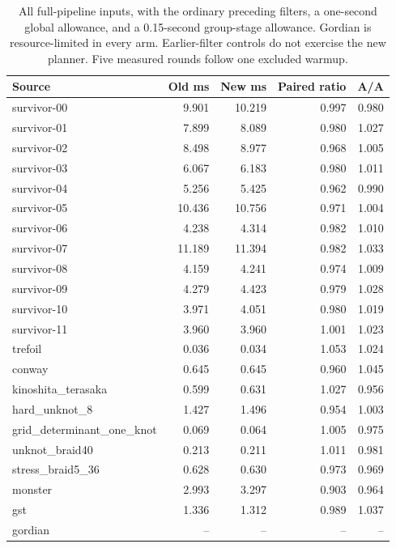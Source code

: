 \begin{table}[htbp]
\centering\small
\begin{tabular}{lrrrr}
\toprule
Source & Old ms & New ms & Paired ratio & A/A \\
\midrule
survivor-00 & 9.901 & 10.219 & 0.997 & 0.980 \\
survivor-01 & 7.899 & 8.089 & 0.980 & 1.027 \\
survivor-02 & 8.498 & 8.977 & 0.968 & 1.005 \\
survivor-03 & 6.067 & 6.183 & 0.980 & 1.011 \\
survivor-04 & 5.256 & 5.425 & 0.962 & 0.990 \\
survivor-05 & 10.436 & 10.756 & 0.971 & 1.004 \\
survivor-06 & 4.238 & 4.314 & 0.982 & 1.010 \\
survivor-07 & 11.189 & 11.394 & 0.982 & 1.033 \\
survivor-08 & 4.159 & 4.241 & 0.974 & 1.009 \\
survivor-09 & 4.279 & 4.423 & 0.979 & 1.028 \\
survivor-10 & 3.971 & 4.051 & 0.980 & 1.019 \\
survivor-11 & 3.960 & 3.960 & 1.001 & 1.023 \\
trefoil & 0.036 & 0.034 & 1.053 & 1.024 \\
conway & 0.645 & 0.645 & 0.960 & 1.045 \\
kinoshita\_terasaka & 0.599 & 0.631 & 1.027 & 0.956 \\
hard\_unknot\_8 & 1.427 & 1.496 & 0.954 & 1.003 \\
grid\_determinant\_one\_knot & 0.069 & 0.064 & 1.005 & 0.975 \\
unknot\_braid40 & 0.213 & 0.211 & 1.011 & 0.981 \\
stress\_braid5\_36 & 0.628 & 0.630 & 0.973 & 0.969 \\
monster & 2.993 & 3.297 & 0.903 & 0.964 \\
gst & 1.336 & 1.312 & 0.989 & 1.037 \\
gordian & -- & -- & -- & -- \\
\bottomrule
\end{tabular}
\caption{All full-pipeline inputs, with the ordinary preceding filters, a one-second global allowance, and a 0.15-second group-stage allowance. Gordian is resource-limited in every arm. Earlier-filter controls do not exercise the new planner. Five measured rounds follow one excluded warmup.}
\label{tab:raw-saturation-pipeline}
\end{table}


